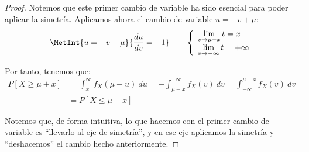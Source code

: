 \begin{proof}
    Notemos que este primer cambio de variable ha sido esencial para poder aplicar la simetría.
    Aplicamos ahora el cambio de variable $u=-v+\mu$:
    \begin{equation*}
        \MetInt{u=-v+\mu}{\dfrac{du}{dv} = -1} \qquad \left\{
            \begin{array}{l}
                \lim\limits_{v\to \mu-x} t = x \\
                \lim\limits_{v\to -\infty} t = +\infty
            \end{array}
        \right.
    \end{equation*}

    Por tanto, tenemos que:
    \begin{align*}
        P[X\geq \mu+x]
        &= \int_{x}^{\infty} f_X(\mu-u)~du
        = -\int_{\mu-x}^{-\infty} f_X(v)~dv
        = \int_{-\infty}^{\mu-x} f_X(v)~dv
        =\\&= P[X\leq \mu-x]
    \end{align*}

    Notemos que, de forma intuitiva, lo que hacemos con el primer cambio de variable es ``llevarlo al eje de simetría'',
    y en ese eje aplicamos la simetría y ``deshacemos'' el cambio hecho anteriormente.
\end{proof}

